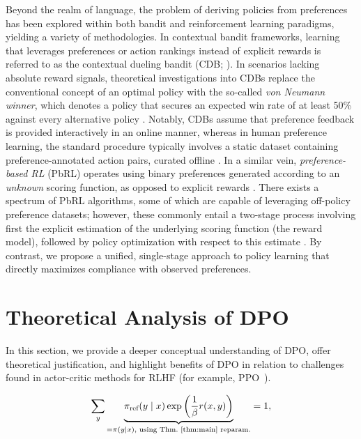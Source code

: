 Beyond the realm of language, the problem of deriving policies from preferences has been explored within both bandit and reinforcement learning paradigms, yielding a variety of methodologies. In contextual bandit frameworks, learning that leverages preferences or action rankings instead of explicit rewards is referred to as the contextual dueling bandit (CDB; \cite{yue2012karmed,dudik2015contextual}). In scenarios lacking absolute reward signals, theoretical investigations into CDBs replace the conventional concept of an optimal policy with the so-called \textit{von Neumann winner}, which denotes a policy that secures an expected win rate of at least 50\% against every alternative policy \citep{dudik2015contextual}. Notably, CDBs assume that preference feedback is provided interactively in an online manner, whereas in human preference learning, the standard procedure typically involves a static dataset containing preference-annotated action pairs, curated offline \citep{yan2022human}. In a similar vein, \textit{preference-based RL} (PbRL) operates using binary preferences generated according to an \textit{unknown} scoring function, as opposed to explicit rewards \citep{BusaFekete2014,ruiz2023dueling}. There exists a spectrum of PbRL algorithms, some of which are capable of leveraging off-policy preference datasets; however, these commonly entail a two-stage process involving first the explicit estimation of the underlying scoring function (the reward model), followed by policy optimization with respect to this estimate \citep{jain2013learning,BusaFekete2014,christiano2017deep,sadigh2017active,kupcsik2018learning}. By contrast, we propose a unified, single-stage approach to policy learning that directly maximizes compliance with observed preferences.

\section{Theoretical Analysis of DPO} In this section, we provide a deeper conceptual understanding of DPO, offer theoretical justification, and highlight benefits of DPO in relation to challenges found in actor-critic methods for RLHF (for example, PPO~\cite{schulman2017proximal}).

\begin{equation}\label{eq:lag_p}
     \sum_{y}\underbrace{\pi_\text{ref}(y\mid x)\exp\left(\frac{1}{\beta}r(x, y)\right)}_{=\pi(y\mid x)\text{, using Thm.~\ref{thm:main} reparam.}} = 1,
\end{equation}

